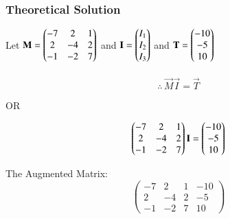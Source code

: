 \documentclass{beamer}
\begin{document}
\begin{frame}[fragile]
    \frametitle{Theoretical Solution}
 Let $\mathbf{M} = \begin{pmatrix}-7 & 2 & 1 \\ 2 & -4 & 2 \\ -1 & -2 & 7\end{pmatrix}$ and $\mathbf{I} = \begin{pmatrix}I_1 \\ I_2 \\ I_3\end{pmatrix}$ and $\mathbf{T} = \begin{pmatrix}-10 \\ -5 \\ 10\end{pmatrix}$\\\\

\begin{equation}
    \therefore \, \vec{M}\vec{I}=\vec{T}
\end{equation}

\begin{center}
OR    
\end{center}

\begin{equation}
    \begin{pmatrix}-7 & 2 & 1 \\ 2 & -4 & 2 \\ -1 & -2 & 7\end{pmatrix}\mathbf{I} = \begin{pmatrix}-10 \\ -5 \\ 10\end{pmatrix}
\end{equation}

The Augmented Matrix:
\begin{equation}
\left(
\begin{array}{ccc|c}
     -7 & 2 & 1 & -10  \\
     2 & -4 & 2 & -5 \\
     -1 & -2 & 7 & 10 
\end{array}
\right)
\end{equation}
\end{frame}
\end{document}
